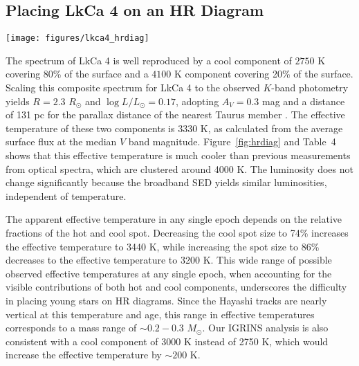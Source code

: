 \documentclass[twocolumn]{emulateapj}%
\begin{document}
\subsection{Placing LkCa 4 on an HR Diagram}

\begin{figure*}
 \centering
 \texttt{[image: figures/lkca4\_hrdiag]}
 \caption{Locations for LkCa 4 on an HR diagram, compared with models of pre-main sequence evolution calculated by \citet{baraffe15} with isochrones (black lines) and evolution models of a single mass (dashed blue lines) as marked.  The measured effective temperature and luminosity from this paper, based on the two-component fit and a median $V$-band magnitude, corresponds to the black asterisk.  The yellow shaded region corresponds to the range of apparent effective temperatures that are would be measured as the hot component rotates into and out of our view.  The blue circle corresponds to the measurement at blue-optical wavelengths by \citet{donati14}, the purple square corresponds to the measurement from low-resolution optical spectra, biased to TiO band strengths, by \citet[][biased to]{herczeg14}, while the red diamond corresponds to what we would measure from the K-band spectrum and 2MASS $J$-band magnitude.}
 \label{fig:hrdiag}
\end{figure*}

The spectrum of LkCa 4 is well reproduced by a cool component of $2750$ K covering 80\% of the surface and a $4100$ K component covering 20\% of the surface.   Scaling this composite spectrum for LkCa 4 to the observed $K$-band photometry yields $R=2.3$ $R_\odot$ and $\log L/L_\odot=0.17$, adopting $A_V=0.3$ mag and a distance of 131 pc for the parallax distance of the nearest Taurus member \citep{torres12}.  The effective temperature of these two components is 3330 K, as calculated from the average surface flux at the median $V$ band magnitude.  Figure~\ref{fig:hrdiag} and Table~4 shows that this effective temperature is much cooler than previous measurements from optical spectra, which are clustered around 4000 K.  The luminosity does not change significantly because the broadband SED yields similar luminosities, independent of temperature.

The apparent effective temperature in any single epoch depends on the relative fractions of the hot and cool spot.  Decreasing the cool spot size to 74\% increases the effective temperature to 3440 K, while increasing the spot size to 86\% decreases to the effective temperature to 3200 K.  This wide range of possible observed effective temperatures at any single epoch, when accounting for the visible contributions of both hot and cool components, underscores the difficulty in placing young stars on HR diagrams.  
Since the Hayashi tracks are nearly vertical at this temperature and age, this range in effective temperatures corresponds to a mass range of $\sim 0.2-0.3$ $M_\odot$.  Our IGRINS analysis is also consistent with a cool component of 3000 K instead of 2750 K, which would increase the effective temperature by $\sim 200$ K.  
\end{document}
